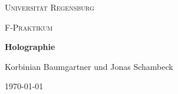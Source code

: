 \begin{titlepage}
	\centering
	{\scshape \LARGE Universität Regensburg \par}
	\vspace{1cm}
	{\scshape\Large F-Praktikum\par}
	\vspace{1.5cm}
	{\huge\bfseries Holographie\par}
	\vspace{2cm}
	\vfill
	{\large Korbinian Baumgartner und Jonas Schambeck\par}

	\vfill

	{\large \today\par}
\end{titlepage}
